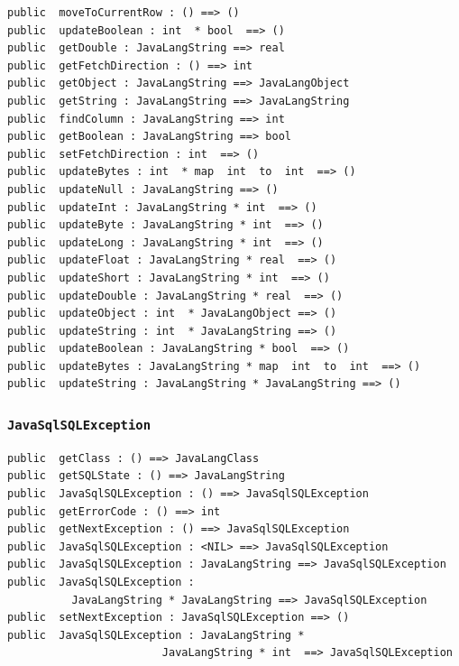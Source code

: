 \documentclass[\pformat,12pt]{article}
\begin{document}
\begin{small}
\begin{verbatim}
public  moveToCurrentRow : () ==> ()
public  updateBoolean : int  * bool  ==> ()
public  getDouble : JavaLangString ==> real
public  getFetchDirection : () ==> int
public  getObject : JavaLangString ==> JavaLangObject
public  getString : JavaLangString ==> JavaLangString
public  findColumn : JavaLangString ==> int
public  getBoolean : JavaLangString ==> bool
public  setFetchDirection : int  ==> ()
public  updateBytes : int  * map  int  to  int  ==> ()
public  updateNull : JavaLangString ==> ()
public  updateInt : JavaLangString * int  ==> ()
public  updateByte : JavaLangString * int  ==> ()
public  updateLong : JavaLangString * int  ==> ()
public  updateFloat : JavaLangString * real  ==> ()
public  updateShort : JavaLangString * int  ==> ()
public  updateDouble : JavaLangString * real  ==> ()
public  updateObject : int  * JavaLangObject ==> ()
public  updateString : int  * JavaLangString ==> ()
public  updateBoolean : JavaLangString * bool  ==> ()
public  updateBytes : JavaLangString * map  int  to  int  ==> ()
public  updateString : JavaLangString * JavaLangString ==> ()
\end{verbatim}
\end{small}

\subsubsection{\texttt{JavaSqlSQLException}}
\begin{small}
\begin{verbatim}
public  getClass : () ==> JavaLangClass
public  getSQLState : () ==> JavaLangString
public  JavaSqlSQLException : () ==> JavaSqlSQLException
public  getErrorCode : () ==> int
public  getNextException : () ==> JavaSqlSQLException
public  JavaSqlSQLException : <NIL> ==> JavaSqlSQLException
public  JavaSqlSQLException : JavaLangString ==> JavaSqlSQLException
public  JavaSqlSQLException : 
          JavaLangString * JavaLangString ==> JavaSqlSQLException
public  setNextException : JavaSqlSQLException ==> ()
public  JavaSqlSQLException : JavaLangString * 
                        JavaLangString * int  ==> JavaSqlSQLException
\end{verbatim}
\end{small}
\end{document}
